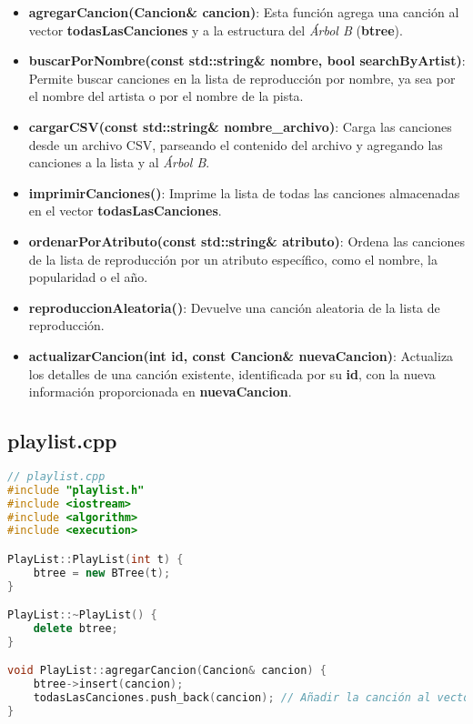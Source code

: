 \documentclass[12pt]{article}
\begin{document}
\begin{flushleft}
                \begin{itemize}[left=4em]
                    \item \textbf{agregarCancion(Cancion\& cancion)}: Esta función agrega una canción al vector \textbf{todasLasCanciones} y a la estructura del \textit{Árbol B} (\textbf{btree}).
                    \item \textbf{buscarPorNombre(const std::string\& nombre, bool searchByArtist)}: Permite buscar canciones en la lista de reproducción por nombre, ya sea por el nombre del artista o por el nombre de la pista.
                    \item \textbf{cargarCSV(const std::string\& nombre\_archivo)}: Carga las canciones desde un archivo CSV, parseando el contenido del archivo y agregando las canciones a la lista y al \textit{Árbol B}.
                    \item \textbf{imprimirCanciones()}: Imprime la lista de todas las canciones almacenadas en el vector \textbf{todasLasCanciones}.
                    \item \textbf{ordenarPorAtributo(const std::string\& atributo)}: Ordena las canciones de la lista de reproducción por un atributo específico, como el nombre, la popularidad o el año.
                    \item \textbf{reproduccionAleatoria()}: Devuelve una canción aleatoria de la lista de reproducción.
                    \item \textbf{actualizarCancion(int id, const Cancion\& nuevaCancion)}: Actualiza los detalles de una canción existente, identificada por su \textbf{id}, con la nueva información proporcionada en \textbf{nuevaCancion}.
                \end{itemize}
            
            \subsection{playlist.cpp}
            \begin{lstlisting}[language=C++, style=mystyle, caption={Código de la Clase Playlist}]
// playlist.cpp
#include "playlist.h"
#include <iostream>
#include <algorithm>
#include <execution> 

PlayList::PlayList(int t) {
    btree = new BTree(t);
}

PlayList::~PlayList() {
    delete btree;
}

void PlayList::agregarCancion(Cancion& cancion) {
    btree->insert(cancion);
    todasLasCanciones.push_back(cancion); // Añadir la canción al vector
}


\end{lstlisting}
\end{flushleft}
\end{document}
